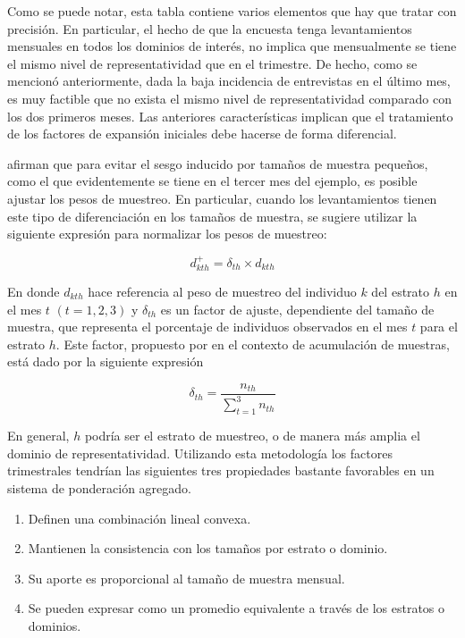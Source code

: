 \documentclass[
  12pt,
  spanish,
]{book}
\providecommand{\tightlist}{%
  \setlength{\itemsep}{0pt}\setlength{\parskip}{0pt}}
\begin{document}
Como se puede notar, esta tabla contiene varios elementos que hay que
tratar con precisión. En particular, el hecho de que la encuesta tenga
levantamientos mensuales en todos los dominios de interés, no
implica que mensualmente se tiene el mismo nivel de representatividad que en el trimestre. De hecho, como se mencionó anteriormente, dada la baja incidencia de entrevistas en el último mes, es muy factible que no exista el mismo nivel de representatividad comparado con los dos primeros meses. Las anteriores características implican que el tratamiento de
los factores de expansión iniciales debe hacerse de forma diferencial.

\citet{Heeringa_West_Berglund_2017} afirman que para evitar el sesgo inducido
por tamaños de muestra pequeños, como el que evidentemente se tiene en
el tercer mes del ejemplo, es posible ajustar los pesos de
muestreo. En particular, cuando los levantamientos tienen este tipo de diferenciación en los tamaños de muestra, se sugiere utilizar la siguiente
expresión para normalizar los pesos de muestreo:

\[
d_{kth}^{+}=\delta_{th} \times d_{kth}
\]

En donde \(d_{kth}\) hace referencia al peso de muestreo del individuo \(k\)
del estrato \(h\) en el mes \(t\) \((t=1, 2, 3)\) y \(\delta_{th}\) es un factor
de ajuste, dependiente del tamaño de muestra, que representa el
porcentaje de individuos observados en el mes \(t\) para el estrato \(h\).
Este factor, propuesto por \citet[p.~131]{Kish_1999} en el contexto de
acumulación de muestras, está dado por la siguiente expresión

\[
\delta_{th} = \frac{n_{th}}{\sum_{t = 1} ^3 n_{th}}
\]

En general, \(h\) podría ser el estrato de muestreo, o de manera más
amplia el dominio de representatividad. Utilizando esta metodología los factores trimestrales tendrían las
siguientes tres propiedades bastante favorables en un sistema de
ponderación agregado.

\begin{enumerate}
\def\labelenumi{\arabic{enumi}.}
\tightlist
\item
  Definen una combinación lineal convexa.
\item
  Mantienen la consistencia con los tamaños por estrato o dominio.
\item
  Su aporte es proporcional al tamaño de muestra mensual.
\item
  Se pueden expresar como un promedio equivalente a través de los estratos o dominios.
\end{enumerate}
\end{document}
